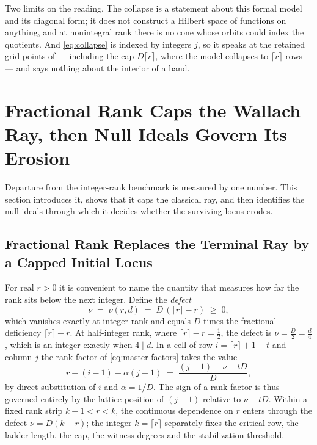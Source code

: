 \documentclass[11pt,letterpaper]{article}
\begin{document}
Two limits on the reading. The collapse is a statement about this formal model
and its diagonal form; it does not construct a Hilbert space of functions on
anything, and at nonintegral rank there is no cone whose orbits could index the
quotients. And \eqref{eq:collapse} is indexed by integers $j$, so it speaks at
the retained grid points of  --- including the cap
$D\lceil r\rceil$, where the model collapses to $\lceil r\rceil$ rows --- and
says nothing about the interior of a band.


\section{Fractional Rank Caps the Wallach Ray, then Null Ideals Govern
  Its Erosion}
\label{sec:erosion}

Departure from the integer-rank benchmark is measured by one number. This
section introduces it, shows that it caps the classical ray, and then identifies
the null ideals through which it decides whether the surviving locus erodes.

\subsection{Fractional Rank Replaces the Terminal Ray by a Capped Initial Locus}

For real $r>0$ it is convenient to name the quantity that measures how far the
rank sits below the next integer. Define the \emph{defect}
\begin{equation}
  \nu\;=\;\nu(r,d)\;=\;D\,(\lceil r\rceil-r)\;\ge\;0,
  \label{eq:defect}
\end{equation}
which vanishes exactly at integer rank and equals $D$ times the fractional
deficiency $\lceil r\rceil-r$. At half-integer rank, where
$\lceil r\rceil-r=\tfrac12$, the defect is $\nu=\tfrac D2=\tfrac d4$, which is an
integer exactly when $4\mid d$. In a cell of row $i=\lceil r\rceil+1+t$ and column
$j$ the rank factor of \eqref{eq:master-factors} takes the value
\begin{equation}
  r-(i-1)+\alpha(j-1)\;=\;\frac{(j-1)-\nu-tD}{D},
  \label{eq:rankcell}
\end{equation}
by direct substitution of $i$ and $\alpha=1/D$. The sign of a rank factor is thus
governed entirely by the lattice position of $(j-1)$ relative to $\nu+tD$. Within
a fixed rank strip $k-1<r<k$, the continuous dependence on $r$ enters through the
defect $\nu=D(k-r)$; the integer $k=\lceil r\rceil$ separately fixes the critical
row, the ladder length, the cap, the witness degrees and the stabilization
threshold.
\end{document}
